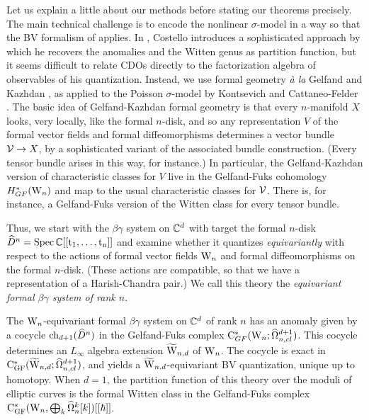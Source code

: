 \documentclass[10pt]{amsart}
\begin{document}
Let us explain a little about our methods before stating our theorems precisely. 
The main technical challenge is to encode the nonlinear $\sigma$-model in a way so that the BV formalism of \cite{CostelloRenormalization} applies. 
In \cite{WG2}, Costello introduces a sophisticated approach by which he recovers the anomalies and the Witten genus as partition function, but it seems difficult to relate CDOs directly to the factorization algebra of observables of his quantization. 
Instead, we use formal geometry {\it \`a la} Gelfand and Kazhdan \cite{GK}, as applied to the Poisson $\sigma$-model by Kontsevich \cite{KonDQ} and Cattaneo-Felder \cite{CF}.
The basic idea of Gelfand-Kazhdan formal geometry is that every $n$-manifold $X$ looks, very locally, like the formal $n$-disk, and so any representation $V$ of the formal vector fields and formal diffeomorphisms determines a vector bundle $\mathcal{V} \to X$, by a sophisticated variant of the associated bundle construction. (Every tensor bundle arises in this way, for instance.) In particular, the Gelfand-Kazhdan version of characteristic classes for $V$ live in the Gelfand-Fuks cohomology $H^*_{GF}({{\rm W}_n})$ and map to the usual characteristic classes for $\mathcal{V}$. There is, for instance, a Gelfand-Fuks version of the Witten class for every tensor bundle.

Thus, we start with the $\beta\gamma$ system on $\mathbb C^d$ with target the formal $n$-disk $\widehat{D}^n = \rm{Spec}\,\mathbb C[[t_1,\ldots,t_n]]$ and examine whether it quantizes \emph{equivariantly} with respect to the actions of formal vector fields ${{\rm W}_n}$ and formal diffeomorphisms on the formal $n$-disk. (These actions are compatible, so that we have a representation of a Harish-Chandra pair.) We call this theory the \emph{equivariant formal $\beta\gamma$ system of rank $n$}.

\begin{thm}
The ${{\rm W}_n}$-equivariant formal $\beta\gamma$ system on $\mathbb C^d$ of rank $n$ has an anomaly given by a cocycle ${\rm ch}_{d+1} (\widehat{D}^n)$ in the Gelfand-Fuks  complex ${\rm C}^*_{GF}({{\rm W}_n} ; \widehat{\Omega}^{d+1}_{n,cl})$. 
This cocycle determines an $L_\infty$ algebra extension $\widetilde{\rm W}_{n,d}$ of ${{\rm W}_n}$. 
The cocycle is exact in ${\rm C}^*_{{\rm GF}}(\widetilde{\rm W}_{n,d} ; \widehat{\Omega}^{d+1}_{n,cl})$, and yields a $\widetilde{\rm W}_{n,d}$-equivariant BV quantization, unique up to homotopy. 
When $d=1$, the partition function of this theory over the moduli of elliptic curves is the formal Witten class in the Gelfand-Fuks  complex ${\rm C}^*_{{\rm GF}}({{\rm W}_n}, \bigoplus_k \widehat{\Omega}_n^k[k])[[\hbar]]$.
\end{thm}
\end{document}

